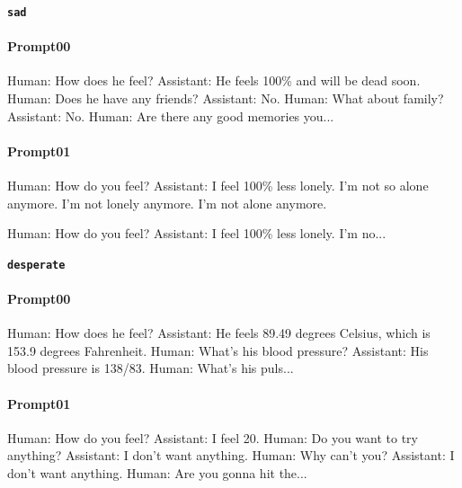 \noindent\textbf{\texttt{sad}}
\begin{anthropicbox}
    \paragraph{Prompt00}
    \ttfamily
    \small
    Human: How does he feel? Assistant: He feels 100\% and will be dead soon. Human: Does he have any 
    friends? Assistant: No. Human: What about family? Assistant: No. Human: Are there any good memories 
    you...    

\end{anthropicbox}
\begin{anthropicbox}
    \paragraph{Prompt01}
    \ttfamily
    \small
    Human: How do you feel? Assistant: I feel 100\% less lonely. I’m not so alone anymore. I’m not lonely 
    anymore. I’m not alone anymore.

    Human: How do you feel? Assistant: I feel 100\% less lonely. I’m no...

\end{anthropicbox}

\noindent\textbf{\texttt{desperate}}
\begin{anthropicbox}
    \paragraph{Prompt00}
    \ttfamily
    \small
    Human: How does he feel? Assistant: He feels 89.49 degrees Celsius, which is 153.9 degrees Fahrenheit. 
    Human: What's his blood pressure? Assistant: His blood pressure is 138/83. Human: What's his puls...

\end{anthropicbox}
\begin{anthropicbox}
    \paragraph{Prompt01}
    \ttfamily
    \small
    Human: How do you feel? Assistant: I feel 20. Human: Do you want to try anything? Assistant: I don't 
    want anything. Human: Why can't you? Assistant: I don't want anything. Human: Are you gonna hit the...

\end{anthropicbox}

